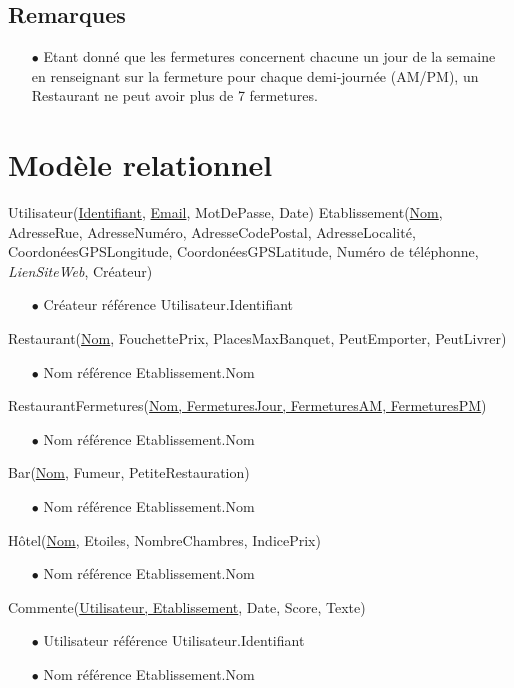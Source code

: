 \documentclass[a4paper, 11pt]{article}
\begin{document}
\subsection*{Remarques}
\begin{itemize}
	\item[$\bullet$] Etant donné que les fermetures concernent chacune un jour de la semaine en renseignant sur la fermeture pour chaque demi-journée (AM/PM), un Restaurant ne peut avoir plus de 7 fermetures. 
\end{itemize}

\section*{Modèle relationnel}
\noindent
Utilisateur(\underline{Identifiant}, \underline{Email}, MotDePasse, Date)
Etablissement(\underline{Nom}, AdresseRue, AdresseNuméro, AdresseCodePostal, AdresseLocalité, CoordonéesGPSLongitude, CoordonéesGPSLatitude, Numéro de téléphonne, \textit{LienSiteWeb}, Créateur)
\begin{itemize}
	\item[$\bullet$] Créateur référence Utilisateur.Identifiant
\end{itemize}
Restaurant(\underline{Nom}, FouchettePrix, PlacesMaxBanquet, PeutEmporter, PeutLivrer)
\begin{itemize}
	\item[$\bullet$] Nom référence Etablissement.Nom
\end{itemize}
RestaurantFermetures(\underline{Nom, FermeturesJour, FermeturesAM, FermeturesPM})
\begin{itemize}
	\item[$\bullet$] Nom référence Etablissement.Nom
\end{itemize}
Bar(\underline{Nom}, Fumeur, PetiteRestauration)
\begin{itemize}
	\item[$\bullet$] Nom référence Etablissement.Nom
\end{itemize}
Hôtel(\underline{Nom}, Etoiles, NombreChambres, IndicePrix)
\begin{itemize}
	\item[$\bullet$] Nom référence Etablissement.Nom
\end{itemize}
Commente(\underline{Utilisateur, Etablissement}, Date, Score, Texte)
\begin{itemize}
	\item[$\bullet$] Utilisateur référence Utilisateur.Identifiant
	\item[$\bullet$] Nom référence Etablissement.Nom
\end{itemize}
\end{document}
